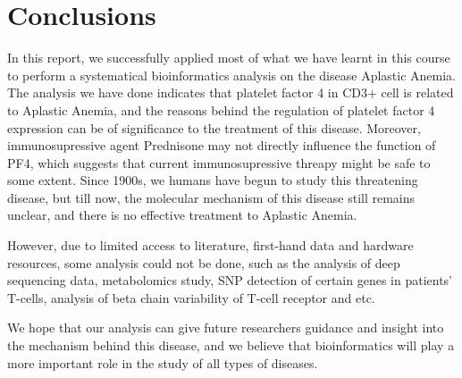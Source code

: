 \section{Conclusions}
In this report, we successfully applied most of what we have learnt in this course to perform a systematical bioinformatics analysis on the disease Aplastic Anemia. The analysis we have done indicates that platelet factor 4 in CD3+ cell is related to Aplastic Anemia, and the reasons behind the regulation of platelet factor 4 expression can be of significance to the treatment of this disease. Moreover, immunosupressive agent Prednisone may not directly influence the function of PF4, which suggests that current immunosupressive threapy might be safe to some extent. Since 1900s, we humans have begun to study this threatening disease, but till now, the molecular mechanism of this disease still remains unclear, and there is no effective treatment to Aplastic Anemia. 

However, due to limited access to literature, first-hand data and hardware resources, some analysis could not be done, such as the analysis of deep sequencing data, metabolomics study, SNP detection of certain genes in patients' T-cells, analysis of beta chain variability of T-cell receptor and etc.

We hope that our analysis can give future researchers guidance and insight into the mechanism behind this disease, and we believe that bioinformatics will play a more important role in the study of all types of diseases.